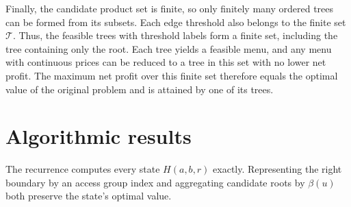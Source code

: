 \begin{IEEEproof}
Finally, the candidate product set is finite, so only finitely many ordered trees can be formed from its subsets. Each edge threshold also belongs to the finite set $\mathcal T$. Thus, the feasible trees with threshold labels form a finite set, including the tree containing only the root. Each tree yields a feasible menu, and any menu with continuous prices can be reduced to a tree in this set with no lower net profit. The maximum net profit over this finite set therefore equals the optimal value of the original problem and is attained by one of its trees.%
\end{IEEEproof}

\setcounter{section}{4}
\section{Algorithmic results}

\begin{lemma}\label{lem:subforest}
The recurrence computes every state $H(a,b,r)$ exactly. Representing the right boundary by an access group index and aggregating candidate roots by $\beta(u)$ both preserve the state's optimal value.
\end{lemma}

